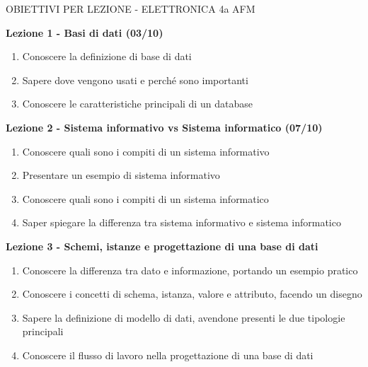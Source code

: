 \documentclass{article}
\begin{document}
\begin{center}
\begin{huge}
OBIETTIVI PER LEZIONE - ELETTRONICA 4a AFM
\end{huge}
\end{center}

	\begin{center}
	\end{center}

	\begin{center}
	\textbf{Lezione 1 - Basi di dati (03/10)}
	\begin{enumerate}
	\item Conoscere la definizione di base di dati
	\item Sapere dove vengono usati e perché sono importanti
	\item Conoscere le caratteristiche principali di un database
	\end{enumerate}
	\end{center}
	
	\begin{center}
	\textbf{Lezione 2 - Sistema informativo vs Sistema informatico (07/10)}
	\begin{enumerate}
	\item Conoscere quali sono i compiti di un sistema informativo
	\item Presentare un esempio di sistema informativo
	\item Conoscere quali sono i compiti di un sistema informatico
	\item Saper spiegare la differenza tra sistema informativo e sistema informatico
	\end{enumerate}
	\end{center}
	
	\begin{center}
	\textbf{Lezione 3 - Schemi, istanze e progettazione di una base di dati}
	\begin{enumerate}
	\item Conoscere la differenza tra dato e informazione, portando un esempio pratico
	\item Conoscere i concetti di schema, istanza, valore e attributo, facendo un disegno
	\item Sapere la definizione di modello di dati, avendone presenti le due tipologie principali
	\item Conoscere il flusso di lavoro nella progettazione di una base di dati
	\end{enumerate}
	\end{center}
\end{document}
